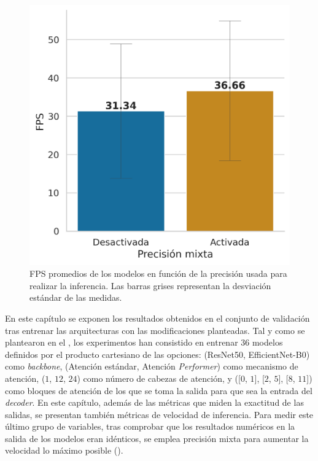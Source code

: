 
\begin{figure}
\vspace{-15pt}
\includegraphics[width=0.95\linewidth]{imagenes/Resultados/mixed_precision.png} 
\caption{FPS promedios de los modelos en función de la precisión usada para realizar la inferencia. Las barras grises representan la desviación estándar de las medidas.}
\label{fig:resultados-mixed-precision}
\end{figure}

En este capítulo se exponen los resultados obtenidos en el conjunto de validación tras entrenar las arquitecturas con las modificaciones planteadas. Tal y como se plantearon en el , los experimentos han consistido en entrenar $36$ modelos definidos por el producto cartesiano de las opciones: (ResNet50, EfficientNet-B0) como \textit{backbone}, (Atención estándar, Atención \textit{Performer}) como mecanismo de atención, ($1$, $12$, $24$) como número de cabezas de atención, y ([$0$, $1$], [$2$, $5$], [$8$, $11$]) como bloques de atención de los que se toma la salida para que sea la entrada del \textit{decoder}. En este capítulo, además de las métricas que miden la exactitud de las salidas, se presentan también métricas de velocidad de inferencia. Para medir este último grupo de variables, tras comprobar que los resultados numéricos en la salida de los modelos eran idénticos, se emplea precisión mixta para aumentar la velocidad lo máximo posible ().


